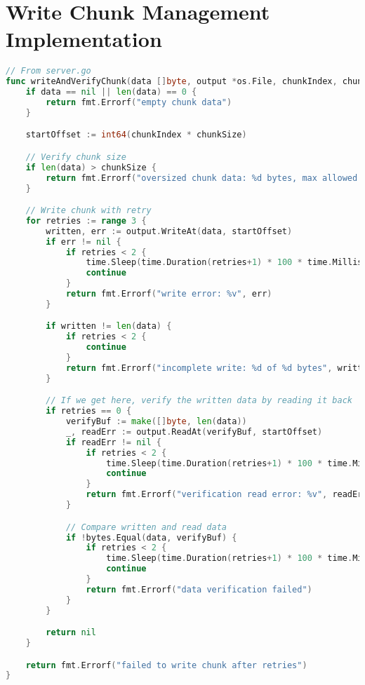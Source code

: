 \documentclass[12pt,a4paper]{report}
\begin{document}
\section{Write Chunk Management Implementation}
\begin{lstlisting}[language=Go, caption={writeAndVerifyChunk Code}, label={lst:write-and-verify-chunk}]
// From server.go
func writeAndVerifyChunk(data []byte, output *os.File, chunkIndex, chunkSize int) error {
    if data == nil || len(data) == 0 {
        return fmt.Errorf("empty chunk data")
    }

    startOffset := int64(chunkIndex * chunkSize)

    // Verify chunk size
    if len(data) > chunkSize {
        return fmt.Errorf("oversized chunk data: %d bytes, max allowed: %d", len(data), chunkSize)
    }

    // Write chunk with retry
    for retries := range 3 {
        written, err := output.WriteAt(data, startOffset)
        if err != nil {
            if retries < 2 {
                time.Sleep(time.Duration(retries+1) * 100 * time.Millisecond)
                continue
            }
            return fmt.Errorf("write error: %v", err)
        }

        if written != len(data) {
            if retries < 2 {
                continue
            }
            return fmt.Errorf("incomplete write: %d of %d bytes", written, len(data))
        }

        // If we get here, verify the written data by reading it back
        if retries == 0 {
            verifyBuf := make([]byte, len(data))
            _, readErr := output.ReadAt(verifyBuf, startOffset)
            if readErr != nil {
                if retries < 2 {
                    time.Sleep(time.Duration(retries+1) * 100 * time.Millisecond)
                    continue
                }
                return fmt.Errorf("verification read error: %v", readErr)
            }

            // Compare written and read data
            if !bytes.Equal(data, verifyBuf) {
                if retries < 2 {
                    time.Sleep(time.Duration(retries+1) * 100 * time.Millisecond)
                    continue
                }
                return fmt.Errorf("data verification failed")
            }
        }

        return nil
    }

    return fmt.Errorf("failed to write chunk after retries")
}
\end{lstlisting}
\end{document}
